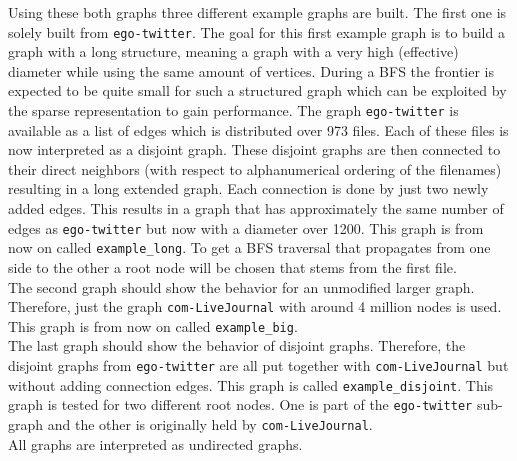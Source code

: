 Using these both graphs three different example graphs are built. The first one is solely built from  \texttt{ego-twitter}. The goal for this first example graph is to build a graph with a long structure, meaning a graph with a very high (effective) diameter while using the same amount of vertices. During a BFS the frontier is expected to be quite small for such a structured graph which can be exploited by the sparse representation to gain performance. The graph \texttt{ego-twitter} is available as a list of edges which is distributed over 973 files. Each of these files is now interpreted as a disjoint graph. These disjoint graphs are then connected to their direct neighbors (with respect to alphanumerical ordering of the filenames) resulting in a long extended graph. Each connection is done by just two newly added edges. This results in a graph that has approximately the same number of edges as \texttt{ego-twitter} but now with a diameter over 1200. This graph is from now on called \texttt{example\_long}. To get a BFS traversal that propagates from one side to the other a root node will be chosen that stems from the first file.\\
The second graph should show the behavior for an unmodified larger graph. Therefore, just the graph  \texttt{com-LiveJournal} with around 4 million nodes is used. This graph is from now on called \texttt{example\_big}.\\
The last graph should show the behavior of disjoint graphs. Therefore, the disjoint graphs from  \texttt{ego-twitter} are all put together with \texttt{com-LiveJournal} but without adding connection edges. This graph is called \texttt{example\_disjoint}. This graph is tested for two different root nodes. One is part of the \texttt{ego-twitter} sub-graph and the other is originally held by \texttt{com-LiveJournal}.\\
All graphs are interpreted as undirected graphs.

